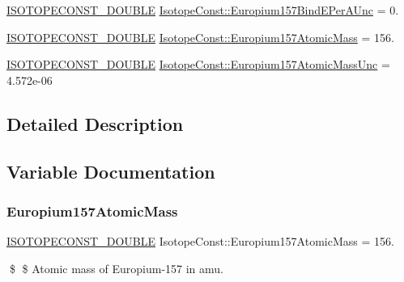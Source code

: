 \begin{DoxyCompactItemize}
\mbox{\hyperlink{group___isotope_const-_macros_ga8f45a7272ce02c0b4c65c44636ed719a}{I\+S\+O\+T\+O\+P\+E\+C\+O\+N\+S\+T\+\_\+\+D\+O\+U\+B\+LE}} \mbox{\hyperlink{group___isotope_const-_europium-_eu157_ga6a4ebd8944be7c561fc3c9d78842368f}{Isotope\+Const\+::\+Europium157\+Bind\+E\+Per\+A\+Unc}} = 0.
\item 
\mbox{\hyperlink{group___isotope_const-_macros_ga8f45a7272ce02c0b4c65c44636ed719a}{I\+S\+O\+T\+O\+P\+E\+C\+O\+N\+S\+T\+\_\+\+D\+O\+U\+B\+LE}} \mbox{\hyperlink{group___isotope_const-_europium-_eu157_ga68b670d667fb73e8c4d42168fc7cfa10}{Isotope\+Const\+::\+Europium157\+Atomic\+Mass}} = 156.
\item 
\mbox{\hyperlink{group___isotope_const-_macros_ga8f45a7272ce02c0b4c65c44636ed719a}{I\+S\+O\+T\+O\+P\+E\+C\+O\+N\+S\+T\+\_\+\+D\+O\+U\+B\+LE}} \mbox{\hyperlink{group___isotope_const-_europium-_eu157_ga38d850d7640b8b2b77e6472c368169cc}{Isotope\+Const\+::\+Europium157\+Atomic\+Mass\+Unc}} = 4.\+572e-\/06
\end{DoxyCompactItemize}


\subsection{Detailed Description}


\subsection{Variable Documentation}
\mbox{\label{group___isotope_const-_europium-_eu157_ga68b670d667fb73e8c4d42168fc7cfa10}} 
\subsubsection{\texorpdfstring{Europium157\+Atomic\+Mass}{Europium157AtomicMass}}
{\footnotesize\ttfamily \mbox{\hyperlink{group___isotope_const-_macros_ga8f45a7272ce02c0b4c65c44636ed719a}{I\+S\+O\+T\+O\+P\+E\+C\+O\+N\+S\+T\+\_\+\+D\+O\+U\+B\+LE}} Isotope\+Const\+::\+Europium157\+Atomic\+Mass = 156.}

\$ \$ Atomic mass of Europium-\/157 in amu. \mbox{\label{group___isotope_const-_europium-_eu157_ga38d850d7640b8b2b77e6472c368169cc}} 
